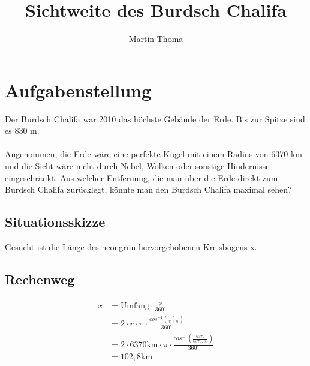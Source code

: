 \documentclass[a4paper,9pt]{scrartcl}
\begin{document}
 \title{Sichtweite des Burdsch Chalifa}
 \author{Martin Thoma}

 \setcounter{section}{1}
 \section*{Aufgabenstellung}
    Der Burdsch Chalifa war 2010 das höchste Gebäude der Erde. Bis zur Spitze 
    sind es 830 m.\\
    \\
    Angenommen, die Erde wäre eine perfekte Kugel mit einem Radius von 6370 km
    und die Sicht wäre nicht durch Nebel, Wolken oder sonstige Hindernisse 
    eingeschränkt. Aus welcher Entfernung, die man über die Erde direkt zum 
    Burdsch Chalifa zurücklegt, könnte man den Burdsch Chalifa maximal sehen?

    \subsection{Situationsskizze}




    Gesucht ist die Länge des neongrün hervorgehobenen Kreisbogens x.

    \subsection{Rechenweg}
    \begin{align}
        x &= \text{Umfang} \cdot \frac{\phi}{360^\circ} \\
          &= 2 \cdot r \cdot \pi \cdot \frac{cos^{-1}(\frac{r}{r+h})}{360^\circ} \\
          &= 2 \cdot 6370 \text{km} \cdot \pi \cdot \frac{cos^{-1}(\frac{6370}{6370,83})}{360^\circ} \\
          &= 102,8 \text{km}
    \end{align}
\end{document}
